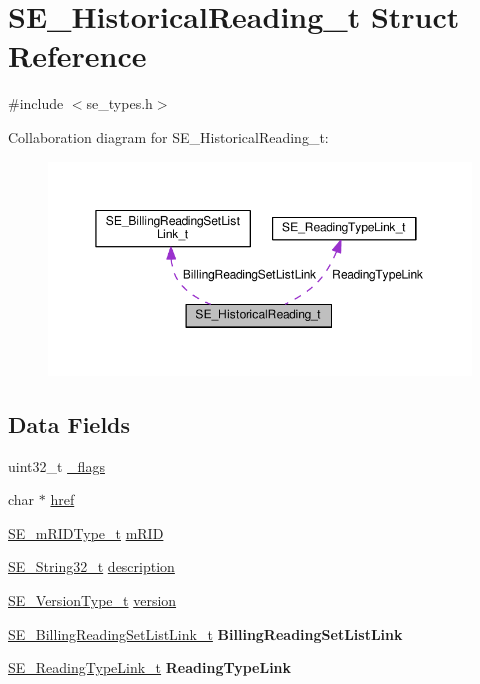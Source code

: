 \hypertarget{structSE__HistoricalReading__t}{}\section{S\+E\+\_\+\+Historical\+Reading\+\_\+t Struct Reference}
\label{structSE__HistoricalReading__t}


{\ttfamily \#include $<$se\+\_\+types.\+h$>$}



Collaboration diagram for S\+E\+\_\+\+Historical\+Reading\+\_\+t\+:\nopagebreak
\begin{figure}[H]
\begin{center}
\leavevmode
\includegraphics[width=350pt]{structSE__HistoricalReading__t__coll__graph}
\end{center}
\end{figure}
\subsection*{Data Fields}
\begin{DoxyCompactItemize}
\item 
uint32\+\_\+t \hyperlink{group__HistoricalReading_gaec60c35670fb8648d5ec83be962f1785}{\+\_\+flags}
\item 
char $\ast$ \hyperlink{group__HistoricalReading_gaff00989792a61ee351a11cb2936a1485}{href}
\item 
\hyperlink{group__mRIDType_gac74622112f3a388a2851b2289963ba5e}{S\+E\+\_\+m\+R\+I\+D\+Type\+\_\+t} \hyperlink{group__HistoricalReading_gaf7799b8df72b4f3d12ea54daed827129}{m\+R\+ID}
\item 
\hyperlink{group__String32_gac9f59b06b168b4d2e0d45ed41699af42}{S\+E\+\_\+\+String32\+\_\+t} \hyperlink{group__HistoricalReading_ga962f40eadac8ad924c5912f1cbacbfc0}{description}
\item 
\hyperlink{group__VersionType_ga4b8d27838226948397ed99f67d46e2ae}{S\+E\+\_\+\+Version\+Type\+\_\+t} \hyperlink{group__HistoricalReading_ga150122578c7309243a68cfc321322f7f}{version}
\item 
\hyperlink{structSE__BillingReadingSetListLink__t}{S\+E\+\_\+\+Billing\+Reading\+Set\+List\+Link\+\_\+t} {\bfseries Billing\+Reading\+Set\+List\+Link}
\item 
\hyperlink{structSE__ReadingTypeLink__t}{S\+E\+\_\+\+Reading\+Type\+Link\+\_\+t} {\bfseries Reading\+Type\+Link}
\end{DoxyCompactItemize}


